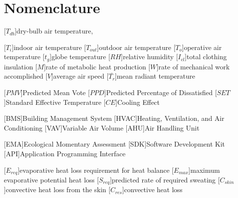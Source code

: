 
\section*{Nomenclature}
\renewcommand{\baselinestretch}{0.75}\normalsize
\begin{acronym}[longest]
[$T_{db}$]{dry-bulb air temperature, }

[$T_{i}$]{indoor air temperature}
[$T_{out}$]{outdoor air temperature}
[$T_{o}$]{operative air temperature}
[$t_{g}$]{globe temperature}
[$RH$]{relative humidity}
[$I_{cl}$]{total clothing insulation}
[$M$]{rate of metabolic heat production}
[$W$]{rate of mechanical work accomplished}
[$V$]{average air speed}
[$\overline{T_{r}}$]{mean radiant temperature}

[$PMV$]{Predicted Mean Vote}
[$PPD$]{Predicted Percentage of Dissatisfied}
[$SET$]{Standard Effective Temperature}
[$CE$]{Cooling Effect}

[BMS]{Building Management System}
[HVAC]{Heating, Ventilation, and Air Conditioning}
[VAV]{Variable Air Volume}
[AHU]{Air Handling Unit}

[EMA]{Ecological Momentary Assessment}
[SDK]{Software Development Kit}
[API]{Application Programming Interface}

[$E_{req}$]{evaporative heat loss requirement for heat balance}
[$E_{max}$]{maximum evaporative potential heat loss}
[$S_{req}$]{predicted rate of required sweating}
[$C_{skin}$]{convective heat loss from the skin}
[$C_{res}$]{convective heat loss }

\end{acronym}
\renewcommand{\baselinestretch}{1}\normalsize
